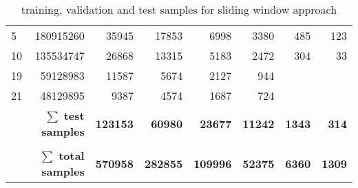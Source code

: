 \begin{table}[hbp]
\begin{tabular}{lrrrrrrr}
5                                                        & 180915260                                               & 35945                  & 17853                   & 6998                    & 3380                    & 485                      & 123                      \\
10                                                       & 135534747                                               & 26868                  & 13315                   & 5183                    & 2472                    & 304                      & 33                       \\
19                                                       & 59128983                                                & 11587                  & 5674                    & 2127                    & 944                     &                          &                          \\
21                                                       & 48129895                                                & 9387                   & 4574                    & 1687                    & 724                     &                          &                          \\
\multicolumn{2}{r}{$\mathbf{\sum}$ \textbf{test samples}}                                                                          & \textbf{123153}        & \textbf{60980}          & \textbf{23677}          & \textbf{11242}          & \textbf{1343}            & \textbf{314}             \\
                                                         &                                                         & \multicolumn{1}{l}{}   & \multicolumn{1}{l}{}    & \multicolumn{1}{l}{}    & \multicolumn{1}{l}{}    & \multicolumn{1}{l}{}     & \multicolumn{1}{l}{}     \\
\multicolumn{2}{r}{$\mathbf{\sum}$ \textbf{total samples}}                                                                         & \textbf{570958}        & \textbf{282855}         & \textbf{109996}         & \textbf{52375}          & \textbf{6360}            & \textbf{1309}            \\ \hline
\end{tabular}
\caption{training, validation and test samples for sliding window approach} \label{tab:methods:samples}
\end{table}

